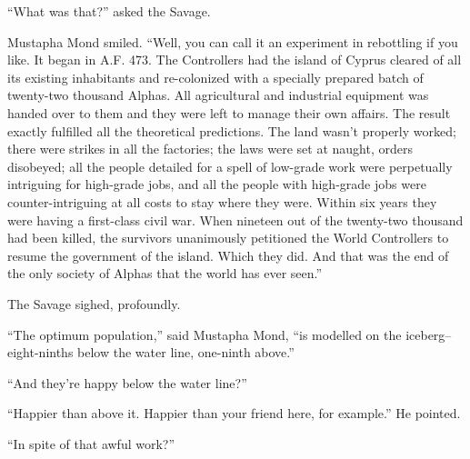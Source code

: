 \documentclass[12pt]{report}
\begin{document}
``What was that?'' asked the Savage.

Mustapha Mond smiled. ``Well, you can call it an experiment in
rebottling if you like. It began in A.F. 473. The Controllers had the
island of Cyprus cleared of all its existing inhabitants and
re-colonized with a specially prepared batch of twenty-two thousand
Alphas. All agricultural and industrial equipment was handed over to
them and they were left to manage their own affairs. The result exactly
fulfilled all the theoretical predictions. The land wasn't properly
worked; there were strikes in all the factories; the laws were set at
naught, orders disobeyed; all the people detailed for a spell of
low-grade work were perpetually intriguing for high-grade jobs, and all
the people with high-grade jobs were counter-intriguing at all costs to
stay where they were. Within six years they were having a first-class
civil war. When nineteen out of the twenty-two thousand had been killed,
the survivors unanimously petitioned the World Controllers to resume the
government of the island. Which they did. And that was the end of the
only society of Alphas that the world has ever seen.''

The Savage sighed, profoundly.

``The optimum population,'' said Mustapha Mond, ``is modelled on the
iceberg--eight-ninths below the water line, one-ninth above.''

``And they're happy below the water line?''

``Happier than above it. Happier than your friend here, for example.''
He pointed.

``In spite of that awful work?''
\end{document}

